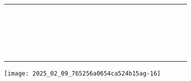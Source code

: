 \documentclass[10pt]{article}
\begin{document}
\begin{center}
\begin{tabular}{|c|c|c|c|c|c|c|c|c|c|c|c|c|c|c|c|c|c|c|c|c|c|c|}
\hline
 &  &  &  &  &  &  &  &  &  &  &  &  &  &  &  &  &  &  &  &  &  &  \\
\hline
 &  &  &  &  &  &  &  &  &  &  &  &  &  &  &  &  &  &  &  &  &  &  \\
\hline
 &  &  &  &  &  &  &  &  &  &  &  &  &  &  &  &  &  &  &  &  &  &  \\
\hline
 &  &  &  &  &  &  &  &  &  &  &  &  &  &  &  &  &  &  &  &  &  &  \\
\hline
 &  &  &  &  &  &  &  &  &  &  &  &  &  &  &  &  &  &  &  &  &  &  \\
\hline
 &  &  &  &  &  &  &  &  &  &  &  &  &  &  &  &  &  &  &  &  &  &  \\
\hline
 &  &  &  &  &  &  &  &  &  &  &  &  &  &  &  &  &  &  &  &  &  &  \\
\hline
 &  &  &  &  &  &  &  &  &  &  &  &  &  &  &  &  &  &  &  &  &  &  \\
\hline
 &  &  &  &  &  &  &  &  &  &  &  &  &  &  &  &  &  &  &  &  &  &  \\
\hline
 &  &  &  &  &  &  &  &  &  &  &  &  &  &  &  &  &  &  &  &  &  &  \\
\hline
 &  &  &  &  &  &  &  &  &  &  &  &  &  &  &  &  &  &  &  &  &  &  \\
\hline
 &  &  &  &  &  &  &  &  &  &  &  &  &  &  &  &  &  &  &  &  &  &  \\
\hline
 &  &  &  &  &  &  &  &  &  &  &  &  &  &  &  &  &  &  &  &  &  &  \\
\hline
 &  &  &  &  &  &  &  &  &  &  &  &  &  &  &  &  &  &  &  &  &  &  \\
\hline
 &  &  &  &  &  &  &  &  &  &  &  &  &  &  &  &  &  &  &  &  &  &  \\
\hline
 &  &  &  &  &  &  &  &  &  &  &  &  &  &  &  &  &  &  &  &  &  &  \\
\hline
 &  &  &  &  &  &  &  &  &  &  &  &  &  &  &  &  &  &  &  &  &  &  \\
\hline
 &  &  &  &  &  &  &  &  &  &  &  &  &  &  &  &  &  &  &  &  &  &  \\
\hline
 &  &  &  &  &  &  &  &  &  &  &  &  &  &  &  &  &  &  &  &  &  &  \\
\hline
 &  &  &  &  &  &  &  &  &  &  &  &  &  &  &  &  &  &  &  &  &  &  \\
\hline
\end{tabular}
\end{center}

\begin{center}
\texttt{[image: 2025\_02\_09\_765256a0654ca524b15ag-16]}
\end{center}
\end{document}
